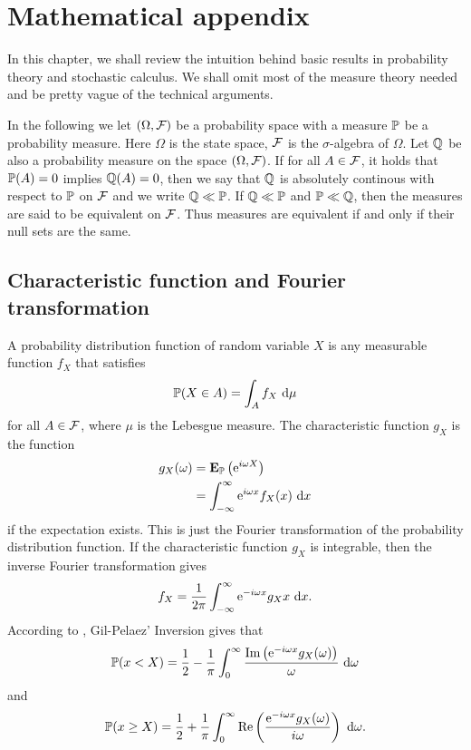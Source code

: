 \chapter{Mathematical appendix}
\label{chap:math}

In this chapter, we shall review the intuition behind basic results in probability theory and stochastic calculus. We shall omit most of the measure theory needed and be pretty vague of the technical arguments.

In the following we let $(\Omega, \mathcal{F})$ be a probability space with a measure $\mathbb{P}$ be a probability measure. Here $\Omega$ is the state space, $\mathcal{F}$ is the $\sigma$-algebra of $\Omega$. Let $\mathbb{Q}$ be also a probability measure on the space $(\Omega, \mathcal{F})$. If for all $A \in \mathcal{F}$, it holds that $\mathbb{P} (A) = 0$ implies $\mathbb{Q} (A) = 0$, then we say that $\mathbb{Q}$ is absolutely continous with respect to $\mathbb{P}$ on $\mathcal{F}$ and we write $\mathbb{Q} \ll \mathbb{P}$. If $\mathbb{Q} \ll \mathbb{P}$ and $\mathbb{P} \ll \mathbb{Q}$, then the measures are said to be equivalent on $\mathcal{F}$. Thus measures are equivalent if and only if their null sets are the same.

\section{Characteristic function and Fourier transformation}

A probability distribution function of random variable $X$ is any measurable function $f_X$ that satisfies
	\begin{align}
		\mathbb{P} ( X \in A ) = \int_A f_X \ \mathrm{d} \mu
	\end{align}
for all $A \in \mathcal{F}$, where $\mu$ is the Lebesgue measure. The characteristic function $g_X$ is the function
	\begin{align}
		g_X (\omega) &= \operatorname{\boldsymbol{\mathrm{E}}}_{\mathbb{P}} \left( \mathrm{e}^{i \omega X} \right) \\
			&= \int_{-\infty}^{\infty} \mathrm{e}^{i \omega x} f_X(x) \ \mathrm{d} x
	\end{align}
if the expectation exists. This is just the Fourier transformation of the probability distribution function. If the characteristic function $g_X$ is integrable, then the inverse Fourier transformation gives
	\begin{align}
		f_X = \frac{1}{2 \pi} \int_{-\infty}^{\infty} \mathrm{e}^{- i \omega x} g_X x \ \mathrm{d} x .
	\end{align}
According to \cite{carrmadan1999optionvaluation}, Gil-Pelaez' Inversion gives that
	\begin{align}
		\Pf( x < X ) = \frac{1}{2} - \frac{1}{\pi} \int_0^{\infty} \frac{\im \left( \e^{-i \omega x} g_X( \omega) \right)}{ \omega} \ \dx  \omega
	\end{align}
and 
	\begin{align}
		\Pf( x \geq X ) = \frac{1}{2} + \frac{1}{\pi} \int_0^{\infty} \re \left( \frac{\e^{-i  \omega x} g_X( \omega)}{ i  \omega} \right) \ \dx  \omega .
	\end{align}	

